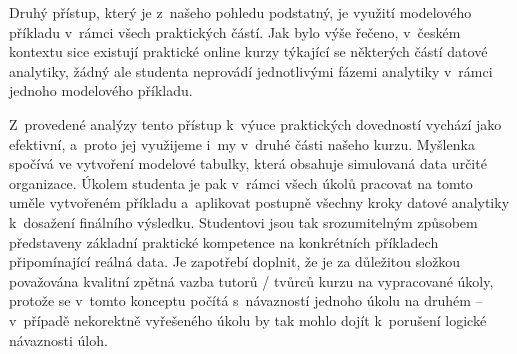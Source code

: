 Druhý přístup, který je z~našeho pohledu podstatný, je využití modelového příkladu v~rámci všech praktických částí. Jak bylo výše řečeno, v~českém kontextu sice existují praktické online kurzy týkající se některých částí datové analytiky, žádný ale studenta neprovádí jednotlivými fázemi analytiky v~rámci jednoho modelového příkladu.

Z~provedené analýzy tento přístup k~výuce praktických dovedností vychází jako efektivní, a~proto jej využijeme i~my v~druhé části našeho kurzu. Myšlenka spočívá ve vytvoření modelové tabulky, která obsahuje simulovaná data určité organizace. Úkolem studenta je pak v~rámci všech úkolů pracovat na tomto uměle vytvořeném příkladu a~aplikovat postupně všechny kroky datové analytiky k~dosažení finálního výsledku. Studentovi jsou tak srozumitelným způsobem představeny základní praktické kompetence na konkrétních příkladech připomínající reálná data. Je zapotřebí doplnit, že je za důležitou složkou považována kvalitní zpětná vazba tutorů / tvůrců kurzu na vypracované úkoly, protože se v~tomto konceptu počítá s~návazností jednoho úkolu na druhém -- v~případě nekorektně vyřešeného úkolu by tak mohlo dojít k~porušení logické návaznosti úloh.
